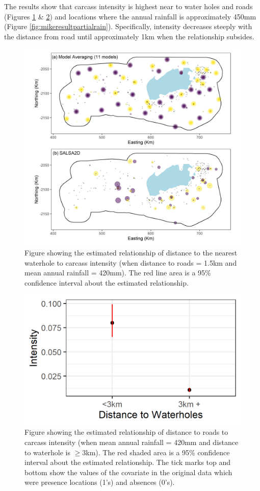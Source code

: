\documentclass[letterpaper, 12pt]{interact}
\begin{document}
	The results show that carcass intensity is highest near to water holes and roads (Figures \ref{fig:mikeresultpartialwater} \& \ref{fig:mikeresultpartialroad}) and locations where the annual rainfall is approximately 450mm (Figure \ref{fig:mikeresultpartialrain}). Specifically, intensity decreases steeply with the distance from road until approximately 1km when the relationship subsides. 
	
	\begin{figure}[!ht]
		\centering
		\includegraphics[width=0.7\linewidth]{images/Figure5.jpg}
		\caption{Figure showing the estimated relationship of distance to the nearest waterhole to carcass intensity (when distance to roads = 1.5km and mean annual rainfall = 420mm).  The red line area is a 95\% confidence interval about the estimated relationship.}
		\label{fig:mikeresultpartialwater}
	\end{figure}
	
	
	\begin{figure}[!ht]
		\centering
		\includegraphics[width=0.7\linewidth]{images/Figure6.jpg}
		\caption{Figure showing the estimated relationship of distance to roads to carcass intensity (when mean annual rainfall = 420mm and distance to waterhole is $\geq3$km).  The red shaded area is a 95\% confidence interval about the estimated relationship. The tick marks top and bottom show the values of the covariate in the original data which were presence locations (1's) and absences (0's).}
		\label{fig:mikeresultpartialroad}
	\end{figure}
	
\end{document}
